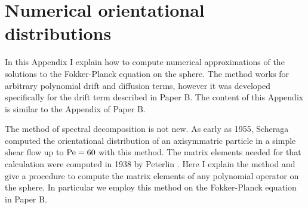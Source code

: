 \documentclass[thesis.tex]{subfiles}
\begin{document}
\chapter{Numerical orientational distributions}\label{app:fpe_sphere}

In this Appendix I explain how to compute numerical approximations of the solutions to the Fokker-Planck equation on the sphere. The method works for arbitrary polynomial drift and diffusion terms, however it was developed specifically for the drift term described in Paper B. The content of this Appendix is similar to the Appendix of Paper B.

The method of spectral decomposition is not new. As early as 1955, Scheraga \cite{scheraga1955} computed the orientational distribution of an axisymmatric particle in a simple shear flow up to $\mbox{Pe}=60$ with this method. The matrix elements needed for that calculation were computed in 1938 by Peterlin \cite{peterlin1938}. Here I explain the method and give a procedure to compute the matrix elements of any polynomial operator on the sphere. In particular we employ this method on the Fokker-Planck equation in Paper B.
\end{document}
